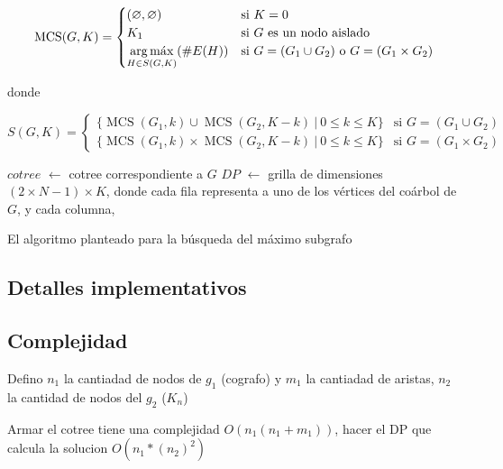 \[
    \operatorname{MCS}(G, K) = \begin{cases}
        (\varnothing, \varnothing) & \text{si } K = 0 \\
        K_1 & \text{si } G \text{ es un nodo aislado} \\
        \displaystyle \argmax_{H \in S(G, K)}(\#E(H)) & \text{si } G = (G_1
        \cup G_2) \text{ o } G = (G_1 \times G_2) \\
    \end{cases}
\]

donde

\[
    S(G, K) = \begin{cases}
        \lbrace \operatorname{MCS}(G_1, k) \cup \operatorname{MCS}(G_2, K -
        k) \ \vert\ 0 \leq k \leq K \rbrace & \text{si } G = (G_1 \cup G_2) \\
        \lbrace \operatorname{MCS}(G_1, k) \times \operatorname{MCS}(G_2, K -
        k) \ \vert\ 0 \leq k \leq K \rbrace & \text{si } G = (G_1 \times G_2)
    \end{cases}
\]

\begin{algorithm}[H]

    $cotree$ $\gets$ cotree correspondiente a $G$ \;
    $DP$ $\gets$ grilla de dimensiones $(2 \times N - 1) \times K$, donde \;
    cada fila representa a uno de los vértices del coárbol de $G$, y cada \;
    columna,
\end{algorithm}


El algoritmo planteado para la búsqueda del máximo subgrafo


\subsection{Detalles implementativos}

\subsection{Complejidad}
Defino $n_1$ la cantiadad de nodos de $g_1$ (cografo) y $m_1$ la cantiadad de aristas, 
$n_2$ la cantidad de nodos del $g_2$ ($K_n$) 

Armar el cotree tiene una complejidad $O(n_1(n_1 + m_1))$, hacer el DP que calcula la solucion $O(n_1 * (n_2)^2 )$

